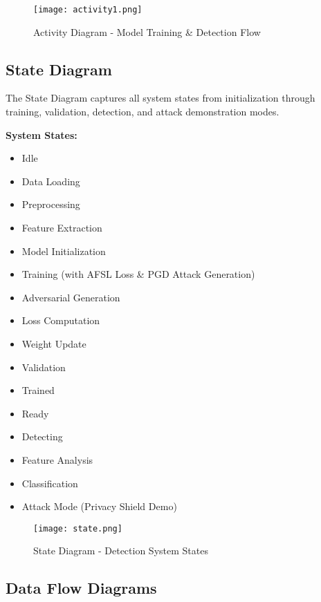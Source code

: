 \documentclass[a4paper,12pt]{article}
\begin{document}
\begin{figure}[h]
    \centering
    \texttt{[image: activity1.png]}
    \caption{Activity Diagram - Model Training \& Detection Flow}
    \label{fig:activity}
\end{figure}

\clearpage

\subsection{State Diagram}
The State Diagram captures all system states from initialization through training, validation, detection, and attack demonstration modes.

\textbf{System States:}
\begin{itemize}
    \item Idle
    \item Data Loading
    \item Preprocessing
    \item Feature Extraction
    \item Model Initialization
    \item Training (with AFSL Loss \& PGD Attack Generation)
    \item Adversarial Generation
    \item Loss Computation
    \item Weight Update
    \item Validation
    \item Trained
    \item Ready
    \item Detecting
    \item Feature Analysis
    \item Classification
    \item Attack Mode (Privacy Shield Demo)
\end{itemize}

\begin{figure}[h]
    \centering
    \texttt{[image: state.png]}
    \caption{State Diagram - Detection System States}
    \label{fig:state}
\end{figure}

\clearpage

\subsection{Data Flow Diagrams}
\end{document}
